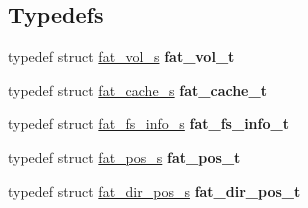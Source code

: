\subsection*{Typedefs}
\begin{DoxyCompactItemize}
\item 
\mbox{\label{group__libfs__dosfs_ga0f1a4474c2b1ba87ce8961a0f403e1b7}} 
typedef struct \mbox{\hyperlink{structfat__vol__s}{fat\+\_\+vol\+\_\+s}} {\bfseries fat\+\_\+vol\+\_\+t}
\item 
\mbox{\label{group__libfs__dosfs_ga9d5534f5f90b2ca41d2c1b3c1ae96270}} 
typedef struct \mbox{\hyperlink{structfat__cache__s}{fat\+\_\+cache\+\_\+s}} {\bfseries fat\+\_\+cache\+\_\+t}
\item 
\mbox{\label{group__libfs__dosfs_ga81d14d68a13fcf50d4f58c91cc8c7ff8}} 
typedef struct \mbox{\hyperlink{structfat__fs__info__s}{fat\+\_\+fs\+\_\+info\+\_\+s}} {\bfseries fat\+\_\+fs\+\_\+info\+\_\+t}
\item 
\mbox{\label{group__libfs__dosfs_ga7b61bc6d313ed61d13ef9d6ae20b93c8}} 
typedef struct \mbox{\hyperlink{structfat__pos__s}{fat\+\_\+pos\+\_\+s}} {\bfseries fat\+\_\+pos\+\_\+t}
\item 
\mbox{\label{group__libfs__dosfs_ga7824dbd3145259c660963084f10da95d}} 
typedef struct \mbox{\hyperlink{structfat__dir__pos__s}{fat\+\_\+dir\+\_\+pos\+\_\+s}} {\bfseries fat\+\_\+dir\+\_\+pos\+\_\+t}
\end{DoxyCompactItemize}
